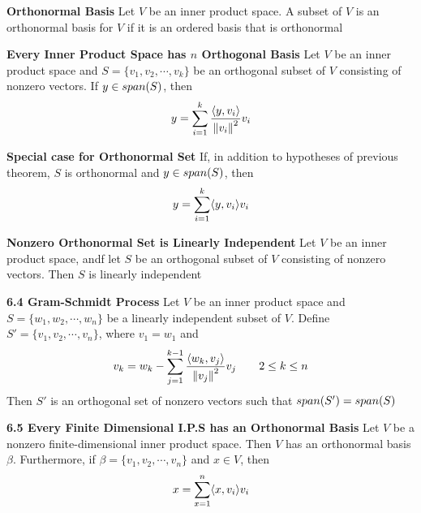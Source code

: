 \documentclass[11pt]{article}
\begin{document}
 

\begin{defn*}
    \textbf{Orthonormal Basis} Let $V$ be an inner product space. A subset of $V$ is an orthonormal basis for $V$ if it is an ordered basis that is orthonormal
\end{defn*}

\begin{defn*}
    \textbf{Every Inner Product Space has $n$ Orthogonal Basis} Let $V$ be an inner product space and $S = \{ v_1, v_2, \cdots, v_k\}$ be an orthogonal subset of $V$ consisting of nonzero vectors. If $y\in span(S)$, then 
    \[
        y = \sum_{i=1}^k \frac{\langle y,v_i\rangle}{\left\lVert v_i\right\rVert^2} v_i
    \]
\end{defn*}

\begin{corollary*}
    \textbf{Special case for Orthonormal Set} If, in addition to hypotheses of previous theorem, $S$ is orthonormal and $y\in span(S)$, then 
    \[
        y = \sum_{i=1}^k \langle y,v_i\rangle v_i    
    \]
\end{corollary*}

\begin{corollary*}
    \textbf{Nonzero Orthonormal Set is Linearly Independent} Let $V$ be an inner product space, andf let $S$ be an orthogonal subset of $V$ consisting of nonzero vectors. Then $S$ is linearly independent
\end{corollary*}

\begin{theorem*}
    \textbf{6.4 Gram-Schmidt Process} Let $V$ be an inner product space and $S = \{w_1,w_2,\cdots, w_n\}$ be a linearly independent subset of $V$. Define $S' = \{v_1,v_2,\cdots, v_n\}$, where $v_1 = w_1$ and 
    \[
        v_k = w_k - \sum_{j=1}^{k-1} \frac{\langle w_k,v_j\rangle}{\left\lVert v_j\right\rVert^2} v_j 
        \quad \quad 
        2\leq k\leq n
    \]
    Then $S'$ is an orthogonal set of nonzero vectors such that $span(S') = span(S)$
\end{theorem*}



\begin{theorem*}
    \textbf{6.5 Every Finite Dimensional I.P.S has an Orthonormal Basis} Let $V$ be a nonzero finite-dimensional inner product space. Then $V$ has an orthonormal basis $\beta$. Furthermore, if $\beta = \{v_1, v_2,\cdots, v_n\}$ and $x\in V$, then 
    \[
        x = \sum_{x=1}^n \langle x,v_i\rangle v_i    
    \]
\end{theorem*}
\end{document}

